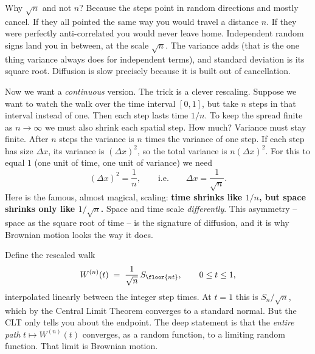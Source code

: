 \begin{intuitionbox}
Why $\sqrt n$ and not $n$? Because the steps point in random directions and
mostly cancel. If they all pointed the same way you would travel a distance $n$.
If they were perfectly anti-correlated you would never leave home. Independent
random signs land you in between, at the scale $\sqrt n$. The variance adds (that
is the one thing variance always does for independent terms), and standard
deviation is its square root. Diffusion is slow precisely because it is built out
of cancellation.
\end{intuitionbox}

Now we want a \emph{continuous} version. The trick is a clever rescaling. Suppose
we want to watch the walk over the time interval $[0,1]$, but take $n$ steps in
that interval instead of one. Then each step lasts time $1/n$. To keep the spread
finite as $n\to\infty$ we must also shrink each spatial step. How much? Variance
must stay finite. After $n$ steps the variance is $n$ times the variance of one
step. If each step has size $\Delta x$, its variance is $(\Delta x)^2$, so the
total variance is $n(\Delta x)^2$. For this to equal $1$ (one unit of time, one
unit of variance) we need
\[
  (\Delta x)^2 = \frac1n,
  \qquad\text{i.e.}\qquad \Delta x = \frac{1}{\sqrt n}.
\]
Here is the famous, almost magical, scaling: \textbf{time shrinks like
$1/n$, but space shrinks only like $1/\sqrt n$.} Space and time scale
\emph{differently}. This asymmetry -- space as the square root of time -- is the
signature of diffusion, and it is why Brownian motion looks the way it does.

Define the rescaled walk
\[
  W^{(n)}(t) \;=\; \frac{1}{\sqrt n}\, S_{\floor{nt}},
  \qquad 0 \le t \le 1,
\]
interpolated linearly between the integer step times. At $t=1$ this is
$S_n/\sqrt n$, which by the Central Limit Theorem converges to a standard normal.
But the CLT only tells you about the endpoint. The deep statement is that the
\emph{entire path} $t\mapsto W^{(n)}(t)$ converges, as a random function, to a
limiting random function. That limit is Brownian motion.

